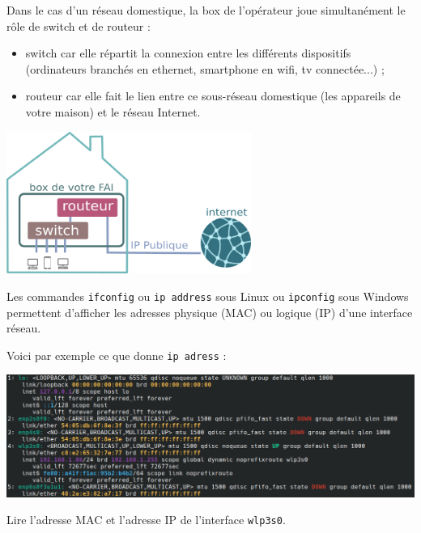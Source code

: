 \documentclass[a4paper,dvipsnames]{article}
\begin{document}
\medskip

\begin{remarque}[breakable, title=Cas d'un réseau domestique]{}{}
  Dans le cas d'un réseau domestique, la box de l'opérateur joue simultanément le rôle de switch et de routeur :
  \begin{itemize}
    \item switch car elle répartit la connexion entre les différents dispositifs (ordinateurs branchés en ethernet, smartphone en wifi, tv connectée...) ;
    \item routeur car elle fait le lien entre ce sous-réseau domestique (les appareils de votre maison) et le réseau Internet.
  \end{itemize}

  \begin{center}
    \includegraphics[width=8cm]{img/boxmaison.png}
  \end{center}
\end{remarque}

\medskip

\begin{definition}[breakable, title=Les commandes ipconfig (Windows) et ip (Linux)]{}{}
  Les commandes \texttt{ifconfig} ou \texttt{ip address} sous Linux ou \texttt{ipconfig} sous Windows permettent d'afficher les adresses physique (MAC) ou logique (IP) d'une interface réseau.
\end{definition}

\medskip

\begin{exercice}[breakable]{}{}
  Voici par exemple ce que donne \texttt{ip adress} :

  \begin{center}
    \includegraphics[width=14cm]{img/ip_address.png}
  \end{center}

  Lire l'adresse MAC et l'adresse IP de l'interface \texttt{wlp3s0}.
\end{exercice}
\end{document}

